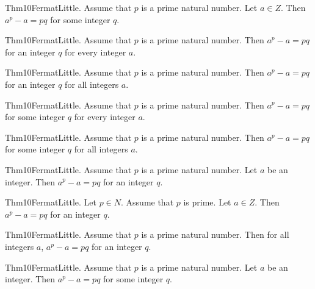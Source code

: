 \documentclass{article}
\begin{document}
Thm10FermatLittle. Assume that $p$ is a prime natural number. Let $a \in Z$. Then $a ^ {p}- a = p q$ for some integer $q$.

Thm10FermatLittle. Assume that $p$ is a prime natural number. Then $a ^ {p}- a = p q$ for an integer $q$ for every integer $a$.

Thm10FermatLittle. Assume that $p$ is a prime natural number. Then $a ^ {p}- a = p q$ for an integer $q$ for all integers $a$.

Thm10FermatLittle. Assume that $p$ is a prime natural number. Then $a ^ {p}- a = p q$ for some integer $q$ for every integer $a$.

Thm10FermatLittle. Assume that $p$ is a prime natural number. Then $a ^ {p}- a = p q$ for some integer $q$ for all integers $a$.

Thm10FermatLittle. Assume that $p$ is a prime natural number. Let $a$ be an integer. Then $a ^ {p}- a = p q$ for an integer $q$.

Thm10FermatLittle. Let $p \in N$. Assume that $p$ is prime. Let $a \in Z$. Then $a ^ {p}- a = p q$ for an integer $q$.

Thm10FermatLittle. Assume that $p$ is a prime natural number. Then for all integers $a$, $a ^ {p}- a = p q$ for an integer $q$.

Thm10FermatLittle. Assume that $p$ is a prime natural number. Let $a$ be an integer. Then $a ^ {p}- a = p q$ for some integer $q$.
\end{document}
